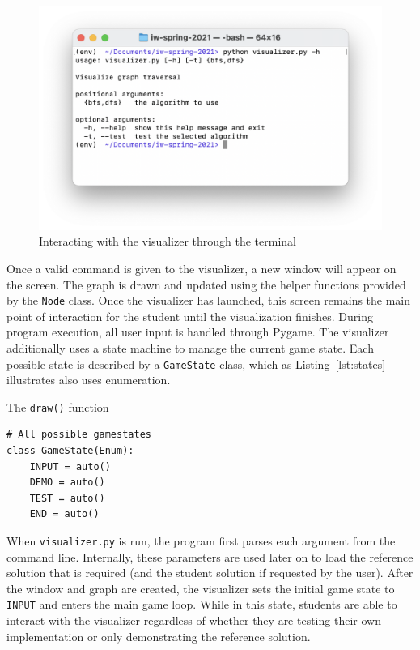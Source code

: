 \documentclass[pageno]{jpaper}
\begin{document}
\begin{figure}[H]
\centering
\includegraphics[width=0.75\linewidth]{argparse.png}
\caption{Interacting with the visualizer through the terminal}
\label{fig:argparse}
\end{figure}

Once a valid command is given to the visualizer, a new window will appear on the screen. The graph is drawn and updated using the helper functions provided by the \texttt{Node} class. Once the visualizer has launched, this screen remains the main point of interaction for the student until the visualization finishes. During program execution, all user input is handled through Pygame. The visualizer additionally uses a state machine to manage the current game state. Each possible state is described by a \texttt{GameState} class, which as Listing~\ref{lst:states} illustrates also uses enumeration.

\begin{listing}[hbt]
\centering
\begin{minipage}{0.8\textwidth}%
\linespread{1.0}
\caption{The \texttt{draw()} function}
\begin{verbatim}
# All possible gamestates
class GameState(Enum):
	INPUT = auto()
	DEMO = auto()
	TEST = auto()
	END = auto()
\end{verbatim}
\label{lst:states}
\end{minipage}
\end{listing}

When \texttt{visualizer.py} is run, the program first parses each argument from the command line. Internally, these parameters are used later on to load the reference solution that is required (and the student solution if requested by the user). After the window and graph are created, the visualizer sets the initial game state to \texttt{INPUT} and enters the main game loop. While in this state, students are able to interact with the visualizer regardless of whether they are testing their own implementation or only demonstrating the reference solution.
\end{document}
